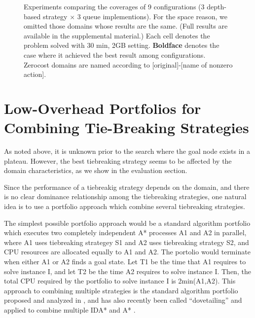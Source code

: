 \begin{figure}[htb]
 \centering
 
 \caption{Experiments
 comparing the coverages of 9 configurations (3 depth-based strategy
 $\times$ 3 queue implementions). For the space reason, we omitted those
 domains whose results are the same. (Full results are available in the
 supplemental material.) Each cell denotes the problem solved with 30
 min, 2GB setting. \textbf{Boldface} denotes the case where it achieved
 the best result among configurations. Zerocost domains are named
 according to [original]-[name of nonzero action].}
 \label{depth}
\end{figure}

%  

\section{Low-Overhead Portfolios for Combining Tie-Breaking Strategies}

As noted above, it is unknown prior to the search where the goal node
exists in a plateau.
However, the best tiebreaking strategy seems to be affected by the domain
characteristics, as we show in the evaluation section.

Since the performance of a tiebreakig strategy depends on the domain, and there is no clear dominance relationship among the tiebreaking strategies, one natural 
idea is to use a portfolio approach which combine several tiebreaking strategies.

The simplest possible portfolio approach would be a standard algorithm portfolio
which executes two completely independent A* processes A1 and A2 in parallel, where A1 uses tiebreaking strategey S1 and A2 uses tiebreaking strategy S2, and CPU resources are allocated equally to A1 and A2.
The portolio would terminate when either A1 or A2 finds a goal state.
Let T1 be the time that A1 requires to solve instance I, and let T2 be the time A2 requires to solve instance I. Then, the total CPU required by the portfolio to solve instance I is 2min(A1,A2). This approach to combining multiple strategies is the standard algorithm portfolio proposed and analyzed in \cite{HubermanLH97,GomesS01}, and has also recently been called ``dovetailing'' and applied to combine multiple IDA* and A*  \cite{ValenzanoSSBK10}. %

